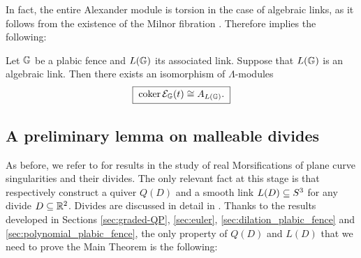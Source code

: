 \noindent In fact, the entire Alexander module is torsion in the case of algebraic links, as it follows from the existence of the Milnor fibration \cite[Chapter 4]{milnor1968}. Therefore  implies the following:

\begin{corollary}\label{cor:cokernel_module_is_Alexander_algebraic_links}
Let $\mathbb G$ be a plabic fence and $L(\mathbb G)$ its associated link. Suppose that $L(\mathbb G)$ is an algebraic link. Then there exists an isomorphism of $\Lambda$-modules
\begin{equation}\label{eq:coker_module_is_Alexander_algebraic}
   \boxed{\;\operatorname{coker}\mathcal E_{\mathbb G}(t)\cong A_{L(\mathbb G)}.\;}
\end{equation}
\end{corollary}

\subsection{A preliminary lemma on malleable divides}

As before, we refer to \cite{ACampo1998,ACampo1999,FPST} for results in the study of real Morsifications of plane curve singularities and their divides. The only relevant fact at this stage is that \cite[Def.~4.2\&Def.~7.1]{FPST} respectively construct a quiver $Q(D)$ and a smooth link $L(D)\subseteq S^3$ for any divide $D\subseteq\mathbb R^2$. Divides are discussed in detail in \cite[Section 2]{FPST}. Thanks to the results developed in Sections \ref{sec:graded-QP}, \ref{sec:euler}, \ref{sec:dilation_plabic_fence} and \ref{sec:polynomial_plabic_fence}, the only property of $Q(D)$ and $L(D)$ that we need to prove the Main Theorem is the following:

